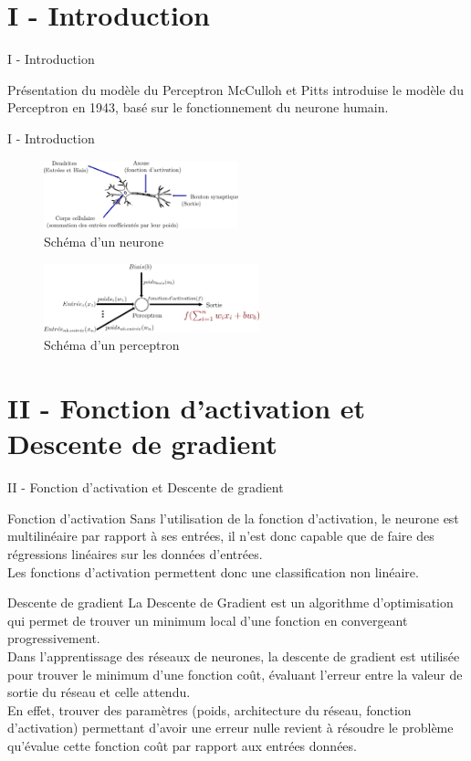 \documentclass[10pt]{beamer}
\begin{document}
\section{I - Introduction}
\begin{frame}{I - Introduction}
\begin{block}{Présentation du modèle du Perceptron}
McCulloh et Pitts introduise le modèle du Perceptron en 1943, basé sur le fonctionnement du neurone humain.
\end{block}
\end{frame}

\begin{frame}{I - Introduction}
\begin{figure}
	\centering
    \includegraphics[height=75px]{2-Neurone.png}
	\caption{Schéma d'un neurone}	
\end{figure}
\begin{figure}
	\centering
    \includegraphics[height=75px]{1-Perceptron.png}
	\caption{Schéma d'un perceptron}	
\end{figure}
\end{frame}

\section{II - Fonction d'activation et Descente de gradient}
\begin{frame}{II - Fonction d'activation et Descente de gradient}
\begin{block}{Fonction d'activation}
Sans l'utilisation de la fonction d'activation, le neurone est multilinéaire par rapport à ses entrées, il n'est donc capable que de faire des régressions linéaires sur les données d'entrées. \\
Les fonctions d'activation permettent donc une classification non linéaire.
\end{block}
\begin{block}{Descente de gradient}
La Descente de Gradient est un algorithme d’optimisation qui permet de trouver un minimum local d'une fonction en convergeant progressivement. \\
Dans l'apprentissage des réseaux de neurones, la descente de gradient est utilisée pour trouver le minimum d'une fonction coût, évaluant l'erreur entre la valeur de sortie du réseau et celle attendu. \\
En effet, trouver des paramètres (poids, architecture du réseau, fonction d'activation) permettant d'avoir une erreur nulle revient à résoudre le problème qu'évalue cette fonction coût par rapport aux entrées données.
\end{block}
\end{frame}
\end{document}
